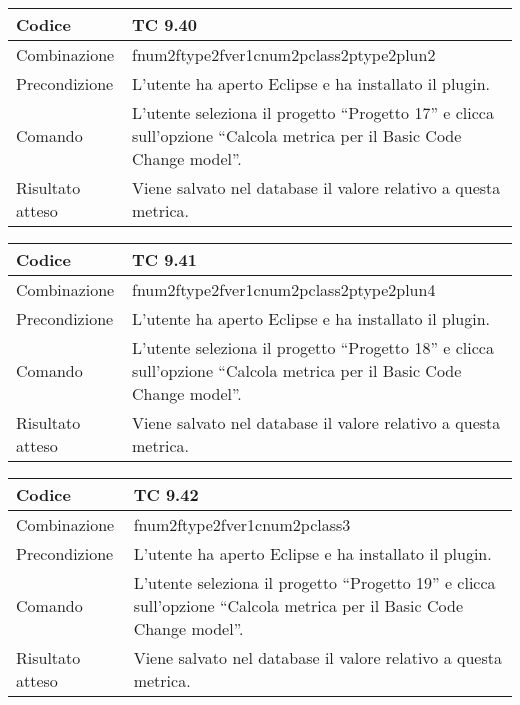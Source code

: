 \begin{table}[ht]
\begin{tabular}{|p{3cm}|p{9cm}|}
\hline
\cellcolor{lightgray}Codice				& TC 9.40								\\
\hline
\cellcolor{lightgray}Combinazione		& fnum2ftype2fver1cnum2pclass2ptype2plun2									\\
\hline
\cellcolor{lightgray}Precondizione		& L'utente ha aperto Eclipse e ha installato il plugin.		\\
\hline
\cellcolor{lightgray}Comando			& L'utente seleziona il progetto ``Progetto 17''  e clicca sull'opzione ``Calcola metrica per il Basic Code Change model''.	\\
\hline
\cellcolor{lightgray}Risultato atteso	& Viene salvato nel database il valore relativo a questa metrica.\\
\hline
\end{tabular}
\end{table}

\begin{table}[ht]
\begin{tabular}{|p{3cm}|p{9cm}|}
\hline
\cellcolor{lightgray}Codice				& TC 9.41								\\
\hline
\cellcolor{lightgray}Combinazione		& fnum2ftype2fver1cnum2pclass2ptype2plun4									\\
\hline
\cellcolor{lightgray}Precondizione		& L'utente ha aperto Eclipse e ha installato il plugin.		\\
\hline
\cellcolor{lightgray}Comando			& L'utente seleziona il progetto ``Progetto 18''  e clicca sull'opzione ``Calcola metrica per il Basic Code Change model''.	\\
\hline
\cellcolor{lightgray}Risultato atteso	& Viene salvato nel database il valore relativo a questa metrica.\\
\hline
\end{tabular}
\end{table}

\begin{table}[ht]
\begin{tabular}{|p{3cm}|p{9cm}|}
\hline
\cellcolor{lightgray}Codice				& TC 9.42								\\
\hline
\cellcolor{lightgray}Combinazione		& fnum2ftype2fver1cnum2pclass3									\\
\hline
\cellcolor{lightgray}Precondizione		& L'utente ha aperto Eclipse e ha installato il plugin.		\\
\hline
\cellcolor{lightgray}Comando			& L'utente seleziona il progetto ``Progetto 19''  e clicca sull'opzione ``Calcola metrica per il Basic Code Change model''.	\\
\hline
\cellcolor{lightgray}Risultato atteso	& Viene salvato nel database il valore relativo a questa metrica.\\
\hline
\end{tabular}
\end{table}

